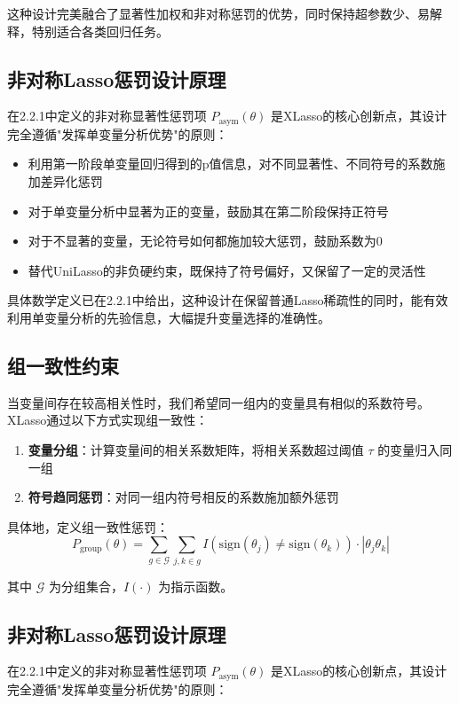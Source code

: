 \documentclass[12pt,a4paper]{article}
\begin{document}
这种设计完美融合了显著性加权和非对称惩罚的优势，同时保持超参数少、易解释，特别适合各类回归任务。

\subsection{非对称Lasso惩罚设计原理}
在2.2.1中定义的非对称显著性惩罚项 $P_{\text{asym}}(\theta)$ 是XLasso的核心创新点，其设计完全遵循"发挥单变量分析优势"的原则：

\begin{itemize}
    \item 利用第一阶段单变量回归得到的p值信息，对不同显著性、不同符号的系数施加差异化惩罚
    \item 对于单变量分析中显著为正的变量，鼓励其在第二阶段保持正符号
    \item 对于不显著的变量，无论符号如何都施加较大惩罚，鼓励系数为0
    \item 替代UniLasso的非负硬约束，既保持了符号偏好，又保留了一定的灵活性
\end{itemize}

具体数学定义已在2.2.1中给出，这种设计在保留普通Lasso稀疏性的同时，能有效利用单变量分析的先验信息，大幅提升变量选择的准确性。

\subsection{组一致性约束}
\label{subsec:group}

当变量间存在较高相关性时，我们希望同一组内的变量具有相似的系数符号。XLasso通过以下方式实现组一致性：

\begin{enumerate}
    \item \textbf{变量分组}：计算变量间的相关系数矩阵，将相关系数超过阈值 $\tau$ 的变量归入同一组
    \item \textbf{符号趋同惩罚}：对同一组内符号相反的系数施加额外惩罚
\end{enumerate}

具体地，定义组一致性惩罚：
\begin{equation}
    P_{\text{group}}(\theta) = \sum_{g \in \mathcal{G}} \sum_{j,k \in g} I(\text{sign}(\theta_j) \neq \text{sign}(\theta_k)) \cdot |\theta_j \theta_k|
\end{equation}

其中 $\mathcal{G}$ 为分组集合，$I(\cdot)$ 为指示函数。


\subsection{非对称Lasso惩罚设计原理}
在2.2.1中定义的非对称显著性惩罚项 $P_{\text{asym}}(\theta)$ 是XLasso的核心创新点，其设计完全遵循"发挥单变量分析优势"的原则：
\end{document}
